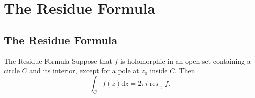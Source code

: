 \section{The Residue Formula}

\subsection{The Residue Formula}

\begin{theorem}{The Residue Formula}{}
  Suppose that $f$ is holomorphic in an open set containing a circle $C$
  and its interior, except for a pole at $z_0$ inside $C$. Then
  \begin{equation}
    \int_C f(z)\mathrm{d} z = 2\pi i \operatorname{res}_{z_0} f.
  \end{equation}
\end{theorem}






